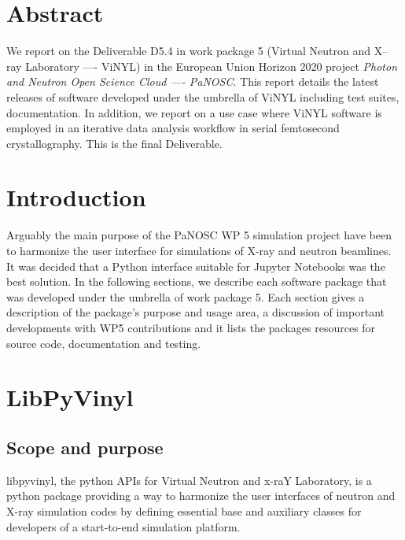 \documentclass[11pt, a4paper]{article}
\begin{document}
\newpage
{}
\newpage
\tableofcontents
\newpage

\section{Abstract}
We report on the Deliverable D5.4 in work package 5 (Virtual Neutron and X--ray
Laboratory ---- ViNYL) in the European Union Horizon 2020 project \emph{Photon
  and Neutron Open Science Cloud ---- PaNOSC}. 
This report details the latest releases of  software developed under the umbrella of
ViNYL including test suites, documentation. In addition, we report on a use case
where ViNYL software is employed in an iterative data analysis workflow in serial
femtosecond crystallography. This is the final Deliverable.

\section{Introduction}

Arguably the main purpose of the PaNOSC WP 5 simulation project have been to
harmonize the user interface for simulations of X-ray and neutron beamlines. It
was decided that a Python interface suitable for Jupyter Notebooks was the best
solution. In the following sections, we describe each software package that was
developed under the umbrella of work package 5. Each section gives a description
of the package's purpose and usage area, a discussion of important developments
with WP5 contributions and it lists the packages resources for source code,
documentation and testing.

\section{LibPyVinyl\label{sec:libpyvinyl}}


\subsection{Scope and purpose}
\label{sec:lpv_scope}
libpyvinyl, the python APIs for Virtual Neutron and x-raY Laboratory, is a python package providing a way to harmonize the user interfaces of neutron and X-ray simulation codes by defining essential base and auxiliary classes for developers of a start-to-end simulation platform. 
\end{document}

